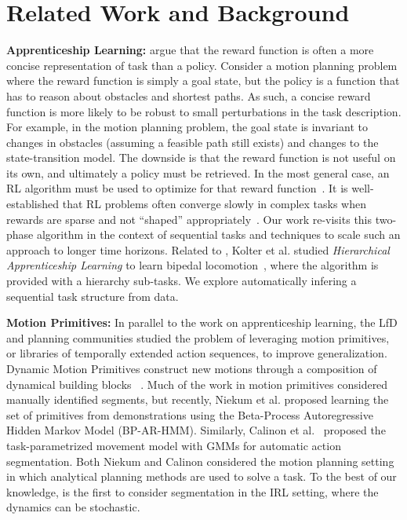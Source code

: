 %
\section{Related Work and Background}

\vspace{0.25em}\noindent\textbf{Apprenticeship Learning: } \cite{abbeel2004apprenticeship} argue that the reward function is often a more concise representation of task than a policy. Consider a motion planning problem where the reward function is simply a goal state, but the policy is a function that has to reason about obstacles and shortest paths. As such, a concise reward function is more likely to be robust to small perturbations in the task description. For example, in the motion planning problem, the goal state is invariant to changes in obstacles (assuming a feasible path still exists) and changes to the state-transition model. 
The downside is that the reward function is not useful on its own, and ultimately a policy must be retrieved. In the most general case, an RL algorithm must be used to optimize for that reward function~\citep{abbeel2004apprenticeship}.
It is well-established that RL problems often converge slowly in complex tasks when rewards are sparse and not ``shaped'' appropriately~\citep{DBLP:conf/icml/NgHR99, DBLP:conf/aaai/JudahFTG14}.
Our work re-visits this two-phase algorithm in the context of sequential tasks and techniques to scale such an approach to longer time horizons.
Related to \hirl, Kolter et al. studied  \emph{Hierarchical Apprenticeship Learning} to learn bipedal locomotion~\citep{DBLP:conf/nips/KolterAN07}, where the algorithm is provided with a hierarchy sub-tasks.
We explore automatically infering a sequential task structure from data.

\vspace{0.25em}\noindent\textbf{Motion Primitives: } In parallel to the work on apprenticeship learning, the LfD and planning communities studied the problem of leveraging motion primitives, or libraries of temporally extended action sequences, to improve generalization. 
Dynamic Motion Primitives construct new motions through a composition of dynamical building blocks ~\citep{ijspreet2002learning,pastor2009learning,manschitz2015learning}.
Much of the work in motion primitives considered manually identified segments, but recently, Niekum et al. \citep{niekum2012learning} proposed learning the set of primitives from demonstrations using the Beta-Process Autoregressive Hidden Markov Model (BP-AR-HMM).
Similarly, Calinon et al.~\citep{calinon2014skills} proposed the task-parametrized movement model with GMMs for automatic action segmentation.
Both Niekum and Calinon considered the motion planning setting in which analytical planning methods are used to solve a task.
To the best of our knowledge, \hirl is the first to consider segmentation in the IRL setting, where the dynamics can be stochastic.

